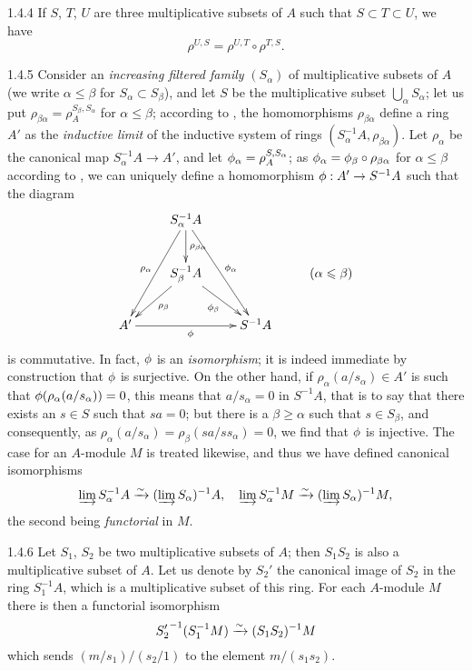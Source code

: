 \begin{env}{1.4.4}
\label{env-0.1.4.4}
If $S$, $T$, $U$ are three multiplicative subsets of $A$ such that
$S\subset T\subset U$, we have
\[
  \rho^{U,S}=\rho^{U,T}\circ\rho^{T,S}.
\]
\end{env}

\begin{env}{1.4.5}
\label{env-0.1.4.5}
Consider an \emph{increasing filtered family} $(S_\alpha)$ of multiplicative
subsets of $A$ (we write $\alpha\leqslant\beta$ for $S_\alpha\subset S_\beta$),
and let $S$ be the multiplicative subset $\bigcup_\alpha S_\alpha$; let us put
$\rho_{\beta\alpha}=\rho_A^{S_\beta,S_\alpha}$ for $\alpha\leqslant\beta$;
according to , the homomorphisms $\rho_{\beta\alpha}$ define a
ring $A'$ as the \emph{inductive limit} of the inductive system of rings
$(S_\alpha^{-1}A,\rho_{\beta\alpha})$. Let $\rho_\alpha$ be the canonical map
$S_\alpha^{-1}A\to A'$, and let $\phi_\alpha=\rho_A^{S,S_\alpha}$; as
$\phi_\alpha=\phi_\beta\circ\rho_{\beta\alpha}$ for $\alpha\leqslant\beta$
according to , we can uniquely define a homomorphism
$\phi:A'\to S^{-1}A$ such that the diagram
\[
  \xymatrix{
    & S_\alpha^{-1}A\ar[ddl]_{\rho_\alpha}
                    \ar[d]^{\rho_{\beta\alpha}}
                    \ar[rdd]^{\vphi_\alpha}\\
    & S_\beta^{-1}A\ar[ld]^{\rho_\beta}
                   \ar[rd]_{\vphi_\beta}
    & & (\alpha\leqslant\beta)\\
    A'\ar[rr]_\vphi
    & & S^{-1}A
  }
\]
is commutative. In fact, $\phi$ is an \emph{isomorphism}; it is indeed
immediate by construction that $\phi$ is surjective. On the other hand, if
$\rho_\alpha(a/s_\alpha)\in A'$ is such that $\phi(\rho_\alpha(a/s_\alpha))=0$,
this means that $a/s_\alpha=0$ in $S^{-1}A$, that is to say that there exists an
$s\in S$ such that $sa=0$; but there is a $\beta\geqslant\alpha$ such that
$s\in S_\beta$, and consequently, as
$\rho_\alpha(a/s_\alpha)=\rho_\beta(sa/ss_\alpha)=0$, we find that $\phi$ is
injective. The case for an $A$-module $M$ is treated likewise, and thus we have
defined canonical isomorphisms
\[
  \varinjlim S_\alpha^{-1}A\xrightarrow{\sim}(\varinjlim S_\alpha)^{-1}A,\quad
  \varinjlim S_\alpha^{-1}M\xrightarrow{\sim}(\varinjlim S_\alpha)^{-1}M,
\]
the second being \emph{functorial} in $M$.
\end{env}

\begin{env}{1.4.6}
\label{env-0.1.4.6}
Let $S_1$, $S_2$ be two multiplicative subsets of $A$; then $S_1 S_2$ is also a
multiplicative subset of $A$. Let us denote by $S_2'$ the canonical image of
$S_2$ in the ring $S_1^{-1}A$, which is a multiplicative subset of this ring.
For each $A$-module $M$ there is then a functorial isomorphism
\[
  {S_2'}^{-1}(S_1^{-1}M)\xrightarrow{\sim}(S_1 S_2)^{-1}M
\]
which sends $(m/s_1)/(s_2/1)$ to the element $m/(s_1 s_2)$.
\end{env}

